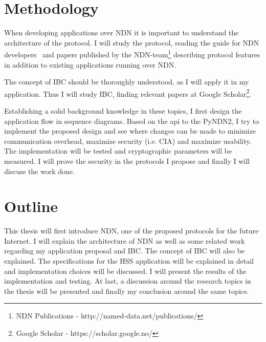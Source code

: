 \section{Methodology}

When developing applications over \gls{NDN} it is important to understand the architecture of the protocol. 
I will study the protocol, reading the guide for NDN developers~\cite{NDN-0021} and papers published by the \gls{NDN}-team\footnote{NDN Publications - http://named-data.net/publications/} describing protocol features in addition to existing applications running over \gls{NDN}.

The concept of \gls{IBC} should be thoroughly understood, as I will apply it in my application.
Thus I will study \gls{IBC}, finding relevant papers at Google Scholar\footnote{Google Scholar - https://scholar.google.no/}.

Establishing a solid background knowledge in these topics, I first design the application flow in sequence diagrams.
Based on the \gls{api} to the \gls{PyNDN2}, I try to implement the proposed design and see where changes can be made to minimize communication overhead, maximize security (i.e. \gls{CIA}) and maximize usability.
The implementation will be tested and cryptographic parameters will be measured.
I will prove the security in the protocols I propose and finally I will discuss the work done.

\section{Outline}

This thesis will first introduce \gls{NDN}, one of the proposed protocols for the future Internet.
I will explain the architecture of \gls{NDN} as well as some related work regarding my application proposal and \gls{IBC}. 
The concept of \gls{IBC} will also be explained.
The specifications for the \gls{HSS} application will be explained in detail and implementation choices will be discussed.
I will present the results of the implementation and testing.
At last, a discussion around the research topics in the thesis will be presented and finally my conclusion around the same topics.
